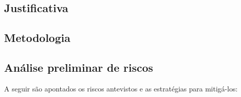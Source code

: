 
\subsection{Justificativa}
\label{ssec:just}

\subsection{Metodologia}
\label{ssec:metod}


\subsection{Análise preliminar de riscos}
\label{ssec:risco}
A seguir são apontados os riscos antevistos e as estratégias para mitigá-los: 
